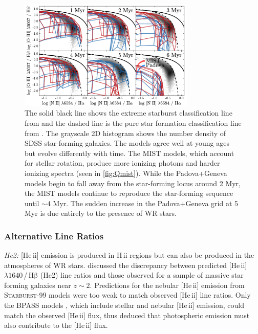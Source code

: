\documentclass[linenumbers, tighten, trackchanges]{aastex61}%
\newcommand{\Fig}[1]{\autoref{fig:#1}}
\newcommand{\SB}{\textsc{Starburst-99}\xspace}
\newcommand{\heii}{[He\,{\sc ii}]\xspace}
\newcommand{\hb}{\ensuremath{\mathrm{H\beta}}}
\newcommand{\hii}{H\,{\sc ii}\xspace}
\newcommand\lam[1]{\ensuremath{\lambda #1}}
\begin{document}
\begin{figure}[!htbp]
  \begin{centering}
    \includegraphics[width=0.75\textwidth]{f24.pdf}
    \caption{ The solid black line shows the extreme starburst classification line from \citet{Kewley01} and the dashed line is the pure star formation classification line from \citet{Kauffmann03a}. The  grayscale 2D histogram shows the number density of SDSS star-forming galaxies. The models agree well at young ages but evolve differently with time. The MIST models, which account for stellar rotation, produce more ionizing photons and harder ionizing spectra (seen in \Fig{Qmist}). While the Padova+Geneva models begin to fall away from the star-forming locus around 2 Myr, the MIST models continue to reproduce the star-forming sequence until ${\sim}4$ Myr. The sudden increase in the Padova+Geneva grid at 5 Myr is due entirely to the presence of WR stars.}
    \label{fig:BPTmistAge}
  \end{centering}
\end{figure}

\subsubsection{Alternative Line Ratios}

{\it He2:} \heii emission is produced in \hii regions but can also be produced in the atmospheres of WR stars. \citet{Steidel16} discussed the discrepancy between predicted \heii\lam{1640}\,/\,\hb{} (He2) line ratios and those observed for a sample of massive star forming galaxies near $z\sim2$. Predictions for the nebular \heii{} emission from \SB{} models were too weak to match observed \heii{} line ratios. Only the BPASS models \citep{Eldridge12}, which include stellar and nebular \heii{} emission, could match the observed \heii{} flux, thus \citet{Steidel16} deduced that photospheric emission must also contribute to the \heii flux. 
\end{document}
